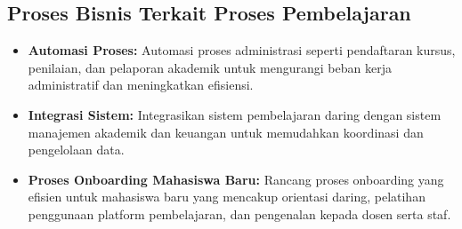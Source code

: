 \subsection{Proses Bisnis Terkait Proses Pembelajaran}
\begin{itemize}
	\item \textbf{Automasi Proses:} Automasi proses administrasi seperti pendaftaran kursus, penilaian, dan pelaporan akademik untuk mengurangi beban kerja administratif dan meningkatkan efisiensi.
	\item \textbf{Integrasi Sistem:} Integrasikan sistem pembelajaran daring dengan sistem manajemen akademik dan keuangan untuk memudahkan koordinasi dan pengelolaan data.
	\item \textbf{Proses Onboarding Mahasiswa Baru:} Rancang proses onboarding yang efisien untuk mahasiswa baru yang mencakup orientasi daring, pelatihan penggunaan platform pembelajaran, dan pengenalan kepada dosen serta staf.
\end{itemize}
